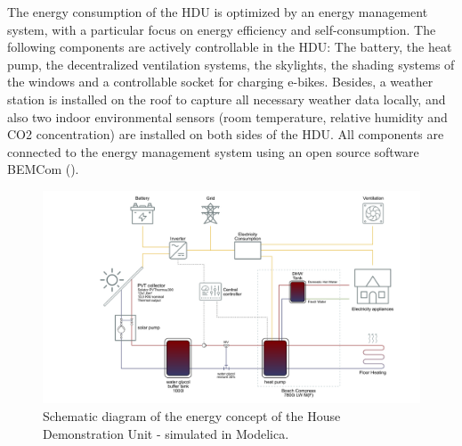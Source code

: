 \documentclass[twocolumn, a4paper,10pt]{article}
\begin{document}
The energy consumption of the HDU is optimized by an energy management system, with a particular focus on energy efficiency and self-consumption. The following components are actively controllable in the HDU: The battery, the heat pump, the decentralized ventilation systems, the skylights, the shading systems of the windows and a controllable socket for charging e-bikes. Besides, a weather station is installed on the roof to capture all necessary weather data locally, and also two indoor environmental sensors (room temperature, relative humidity and CO2 concentration) are installed on both sides of the HDU. All components are connected to the energy management system using an open source software BEMCom (\citeyear{Woelfle2022}).

\begin{figure}[ht]
\centering
\includegraphics[trim={9cm 0 0 0},scale=0.3]{img/HDU_SimConcept.pdf}
\vspace{-5pt} 
\caption{Schematic diagram of the energy concept of the House Demonstration Unit - simulated in Modelica.}
\label{fig:HDU_SimConcept}
\end{figure}

\end{document}
